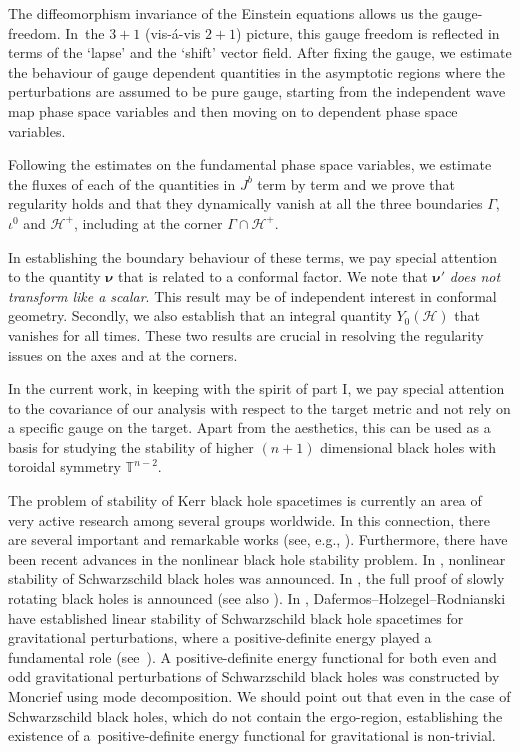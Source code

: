 \documentclass[pdftex]{sigma}
\def\mbo#1{\boldsymbol{#1}}%
\renewcommand{\H}{\mathcal{H}}
\numberwithin{equation}{section}
\begin{document}
 The diffeomorphism invariance of the Einstein equations allows us the gauge-freedom. In~the ${3+1}$ (vis-\'a-vis $2+1$) picture, this gauge freedom is reflected in terms of the `lapse' and the `shift' vector field. After fixing the gauge, we estimate the behaviour of gauge dependent quantities in the asymptotic regions where the perturbations are assumed to be pure gauge, starting from the independent wave map phase space variables and then moving on to dependent phase space variables.

 Following the estimates on the fundamental phase space variables, we estimate the fluxes of each of the quantities in $J^b$ term by term and we prove that regularity holds and that they dynamically vanish at all the three boundaries $\Gamma$, $\iota^0$ and $\H^+$, including at the corner $\Gamma \cap \H^+$.

 In establishing the boundary behaviour of these terms,
 we pay special attention to the quantity $\mbo{\nu}$ that is related to a conformal factor. We note that $\mbo{\nu}'$ \emph{does not transform like a scalar}.
 This result may be of independent interest in conformal geometry. Secondly, we also establish that an integral quantity $Y_0(\mathcal{H})$ that vanishes for all times. These two results are crucial in resolving the regularity issues on the axes and at the corners.

In the current work, in keeping with the spirit of part I, we pay special attention to the covariance
of our analysis with respect to the target metric and not rely on a specific gauge on the target. Apart from the aesthetics, this can be used as a basis for studying the stability of higher $(n+1)$ dimensional black holes with toroidal symmetry $\mathbb{T}^{n-2}$.

The problem of stability of Kerr black hole spacetimes is currently an area of very active research among several groups worldwide. In this connection, there are several important and remarkable works (see, e.g., \cite{ABBM_19,LB_15_1, LB_15_2,HDR_17,DR_11, HHV_19, SMa_17_1, SMa_17_2, Tato_11}). Furthermore, there have been recent advances in the nonlinear black hole stability problem. In \cite{HDRT_21}, nonlinear stability of Schwarzschild black holes was announced. In \cite{GKS_22}, the full proof of slowly rotating black holes is announced (see also \cite{GKS_20, KS_21}). In \cite{HDR_16}, Dafermos--Holzegel--Rodnianski have established linear stability of Schwarzschild black hole spacetimes for gravitational perturbations, where a positive-definite energy played a fundamental role (see~\cite{GH_16}).
A positive-definite energy functional for both even and odd gravitational perturbations of Schwarzschild black holes was constructed by Moncrief \cite{Moncrief_74} using mode decomposition. We should point out that even in the case of Schwarzschild black holes, which do not contain the ergo-region, establishing the existence of a~positive-definite energy functional for gravitational is non-trivial.
\end{document}
